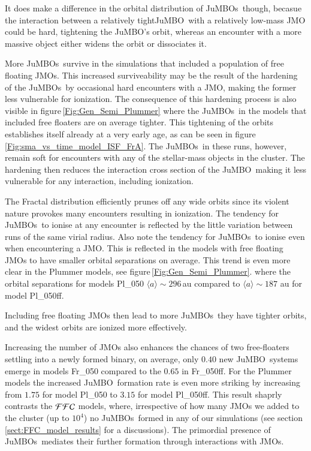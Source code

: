 \documentclass[submission,phys]{lib/SciPost}
\newcommand{\jumbo}{\mbox{JuMBO}}
\newcommand{\jumbos}{\mbox{JuMBOs}}
\begin{document}
It does make a difference in the orbital distribution of \jumbos\,
though, becasue the interaction between a relatively tight\jumbo\,
with a relatively low-mass JMO could be hard, tightening the \jumbo's
orbit, whereas an encounter with a more massive object either widens
the orbit or dissociates it.

More \jumbos\, survive in the simulations that included a population
of free floating JMOs.  This increased surviveability may be the
result of the hardening of the \jumbos\, by occasional hard encounters
with a JMO, making the former less vulnerable for ionization.  The
consequence of this hardening process is also visible in
figure\,\ref{Fig:Gen_Semi_Plummer} where the \jumbos\, in the models
that included free floaters are on average tighter.  This tightening
of the orbits establishes itself already at a very early age, as can
be seen in figure\,\ref{Fig:sma_vs_time_model_ISF_FrA}.  The \jumbos\,
in these runs, however, remain soft for encounters with any of the
stellar-mass objects in the cluster. The hardening then reduces the
interaction cross section of the \jumbo\, making it less vulnerable
for any interaction, including ionization.

The Fractal distribution efficiently prunes off any wide orbits since
its violent nature provokes many encounters resulting in
ionization. The tendency for \jumbos\, to ionise at any encounter is
reflected by the little variation between runs of the same virial
radius. Also note the tendency for \jumbos\, to ionise even when
encountering a JMO. This is reflected in the models with free floating
JMOs to have smaller orbital separations on average.  This trend is
even more clear in the Plummer models, see
figure\,\ref{Fig:Gen_Semi_Plummer}.  where the orbital separations for
models Pl\_050 $\langle a\rangle\sim296$\,au compared to $\langle
a\rangle\sim187$ au for model Pl\_050ff.

Including free floating JMOs
then lead to more \jumbos\, they have tighter orbits, and the widest
orbits are ionized more effectively.

Increasing the number of JMOs also enhances the chances of two
free-floaters settling into a newly formed binary, on average, only
$0.40$ new \jumbo\, systems emerge in models Fr\_050 compared to the
$0.65$ in Fr\_050ff. For the Plummer models the increased \jumbo\,
formation rate is even more striking by increasing from $1.75$ for
model Pl\_050 to $3.15$ for model Pl\_050ff.  This result shaprly
contrasts the ${\cal FFC}$ models, where, irrespective of how many
JMOs we added to the cluster (up to $10^4$) no \jumbos\, formed in any
of our simulations (see section\,\ref{sect:FFC_model_results} for a
discussions). The primordial presence of \jumbos\, mediates their
further formation through interactions with JMOs.
\end{document}
